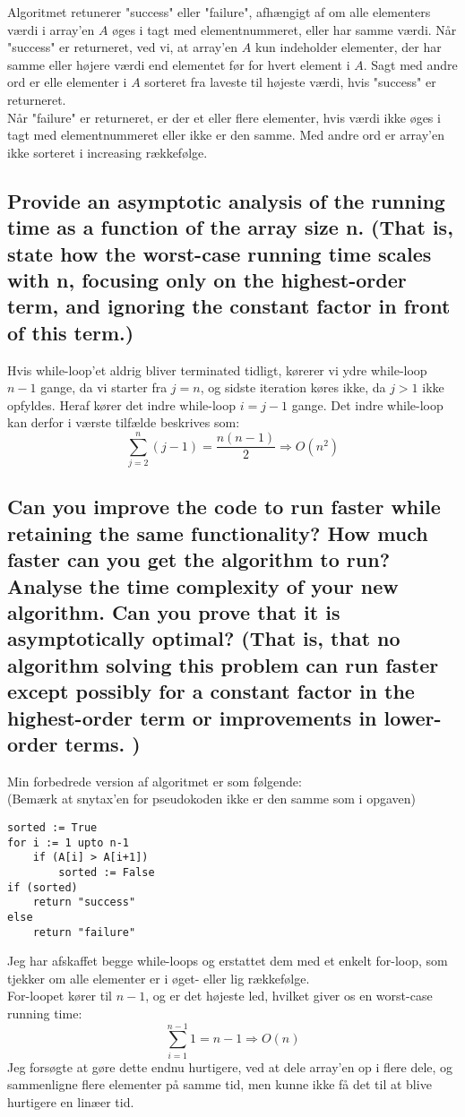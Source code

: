 \documentclass[a4paper,12pt]{article}
\begin{document}
Algoritmet retunerer "success" eller "failure", afhængigt af om alle elementers værdi i array'en $A$ øges i tagt med elementnummeret, eller har samme værdi.
Når "success" er returneret, ved vi, at array'en $A$ kun indeholder elementer, der har samme eller højere værdi end elementet før for hvert element i $A$. Sagt med andre ord er elle elementer i $A$ sorteret fra laveste til højeste værdi, hvis "success" er returneret.\\
Når "failure" er returneret, er der et eller flere elementer, hvis værdi ikke øges i tagt med elementnummeret eller ikke er den samme. Med andre ord er array'en ikke sorteret i increasing rækkefølge.
    
\subsection[]{Provide an asymptotic analysis of the running time as a function of the array size n. (That
is, state how the worst-case running time scales with n, focusing only on the highest-order
term, and ignoring the constant factor in front of this term.)}

Hvis while-loop'et aldrig bliver terminated tidligt, kørerer vi ydre while-loop $n-1$ gange, da vi starter fra $j = n$, og sidste iteration køres ikke, da $j > 1$ ikke opfyldes. Heraf kører det indre while-loop $i=j-1$ gange. Det indre while-loop kan derfor i værste tilfælde beskrives som:
\[\sum_{j=2}^{n}(j-1)=\dfrac{n(n-1)}{2}\Rightarrow O(n^2)\]

\subsection[]{Can you improve the code to run faster while retaining the same functionality? How
much faster can you get the algorithm to run? Analyse the time complexity of your new
algorithm. Can you prove that it is asymptotically optimal? (That is, that no algorithm
solving this problem can run faster except possibly for a constant factor in the highest-order
term or improvements in lower-order terms. )}

Min forbedrede version af algoritmet er som følgende:\\
(Bemærk at snytax'en for pseudokoden ikke er den samme som i opgaven)
\begin{lstlisting}
sorted := True          
for i := 1 upto n-1     
    if (A[i] > A[i+1])  
        sorted := False 
if (sorted)             
    return "success"    
else                    
    return "failure"  
\end{lstlisting}
Jeg har afskaffet begge while-loops og erstattet dem med et enkelt for-loop, som tjekker om alle elementer er i øget- eller lig rækkefølge.\\
For-loopet kører til $n-1$, og er det højeste led, hvilket giver os en worst-case running time: 
\[\sum_{i=1}^{n-1}1=n-1\Rightarrow O(n)\]
Jeg forsøgte at gøre dette endnu hurtigere, ved at dele array'en op i flere dele, og sammenligne flere elementer på samme tid, men kunne ikke få det til at blive hurtigere en linæer tid.
\end{document}
